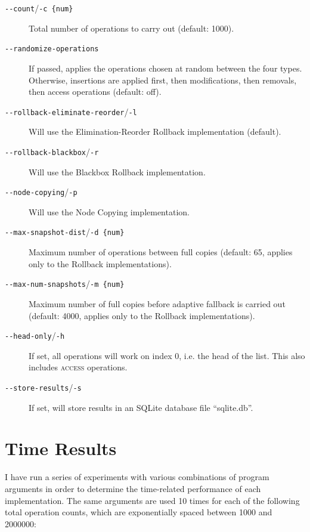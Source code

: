 \begin{description}

  \item[\texttt{-\@{}-count}/\texttt{-c \{num\}}] Total number of operations to
  carry out (default: 1000).

  \item[\texttt{-\@{}-randomize-operations}] If passed, applies the operations
  chosen at random between the four types. Otherwise, insertions are applied
  first, then modifications, then removals, then access operations (default:
  off).

  \item[\texttt{-\@{}-rollback-eliminate-reorder}/\texttt{-l}] Will use the
  Elimination-Reorder Rollback implementation (default).

  \item[\texttt{-\@{}-rollback-blackbox}/\texttt{-r}] Will use the Blackbox
  Rollback implementation.

  \item[\texttt{-\@{}-node-copying}/\texttt{-p}] Will use the Node Copying
  implementation.

  \item[\texttt{-\@{}-max-snapshot-dist}/\texttt{-d \{num\}}] Maximum number of
  operations between full copies (default: 65, applies only to the Rollback
  implementations).

  \item[\texttt{-\@{}-max-num-snapshots}/\texttt{-m \{num\}}] Maximum number of
  full copies before adaptive fallback is carried out (default: 4000, applies
  only to the Rollback implementations).

  \item[\texttt{-\@{}-head-only}/\texttt{-h}] If set, all operations will work
  on index 0, i.e. the head of the list. This also includes \textsc{access}
  operations.

  \item[\texttt{-\@{}-store-results}/\texttt{-s}] If set, will store results in
  an SQLite database file ``sqlite.db''.
  
\end{description}

\section{Time Results}
\label{sec:time-results}

I have run a series of experiments with various combinations of program
arguments in order to determine the time-related performance of each
implementation. The same arguments are used 10 times for each of the following
total operation counts, which are exponentially spaced between 1000 and 2000000:

